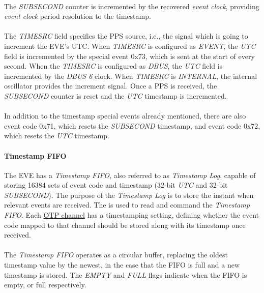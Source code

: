 \documentclass[openany]{article}
\begin{document}
			\paragraph{} The \emph{SUBSECOND} counter is incremented by the recovered \emph{event clock}, providing \emph{event clock} period resolution to the timestamp.
			\paragraph{} The \emph{TIMESRC} field specifies the PPS source, i.e., the signal which is going to increment the EVE's UTC. When \emph{TIMESRC} is configured as \emph{EVENT}, the \emph{UTC} field is incremented by the special event 0x73, which is sent at the start of every second. When the \emph{TIMESRC} is configured as \emph{DBUS}, the \emph{UTC} field is incremented by the \emph{DBUS 6} clock. When \emph{TIMESRC} is \emph{INTERNAL}, the internal oscillator provides the increment signal. Once a PPS is received, the \emph{SUBSECOND} counter is reset and the \emph{UTC} timestamp is incremented.
			\paragraph{} In addition to the timestamp special events already mentioned, there are also event code 0x71, which resets the \emph{SUBSECOND} timestamp, and event code 0x72, which resets the \emph{UTC} timestamp.

			\paragraph{Timestamp FIFO} The EVE has a \emph{Timestamp FIFO}, also referred to as \emph{Timestamp Log}, capable of storing 16384 sets of event code and timestamp (32-bit \emph{UTC} and 32-bit \emph{SUBSECOND}). The purpose of the \emph{Timestamp Log} is to store the instant when relevant events are received. The  is used to read and command the \emph{Timestamp FIFO}. Each \hyperref[sec:eve-trigger-generation]{OTP channel} has a timestamping setting, defining whether the event code mapped to that channel should be stored along with its timestamp once received.
			\paragraph{} The \emph{Timestamp FIFO} operates as a circular buffer, replacing the oldest timestamp value by the newest, in the case that the FIFO is full and a new timestamp is stored.
			The \emph{EMPTY} and \emph{FULL} flags indicate when the FIFO is empty, or full respectively.
\end{document}
